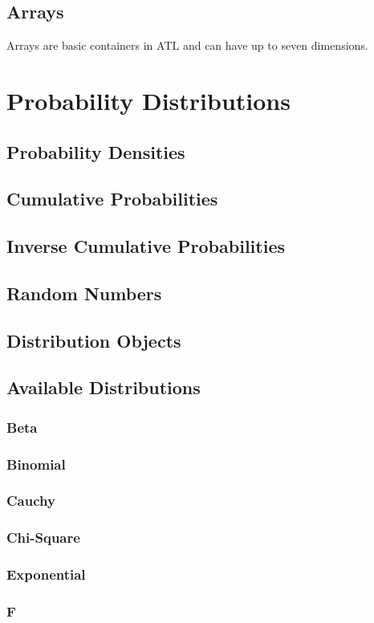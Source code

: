 \documentclass[12pt,a4paper]{article}
\begin{document}
\subsection{Arrays}
Arrays are basic containers in ATL and can have up to seven dimensions.  
\section{Probability Distributions}
\subsection{Probability Densities}
\subsection{Cumulative Probabilities}
\subsection{Inverse Cumulative Probabilities}
\subsection{Random Numbers}
\subsection{Distribution Objects}
\subsection{Available Distributions}
\subsubsection{Beta}
\subsubsection{Binomial}
\subsubsection{Cauchy}
\subsubsection{Chi-Square}
\subsubsection{Exponential}
\subsubsection{F}
\end{document}
